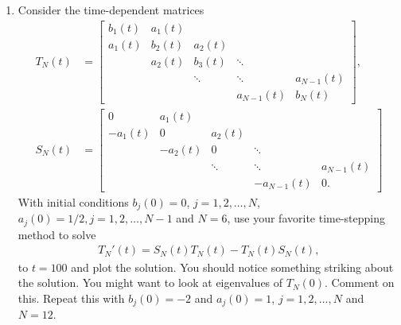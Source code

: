 \documentclass[10pt]{amsart}
\begin{document}
\begin{enumerate}[label={\bf Problem~{\arabic*}:}]
\mline
\item Consider the time-dependent matrices
  \begin{align*}
    T_N(t) &= \begin{bmatrix}
      b_1(t) & a_1(t)\\
      a_1(t) & b_{2}(t) & a_{2}(t)\\
      & a_{2}(t) & b_{3}(t) & \ddots\\
      && \ddots & \ddots & a_{N-1}(t) \\
       &&& a_{N-1}(t) & b_N(t)
     \end{bmatrix},\\
    S_N(t) &= \begin{bmatrix}
      0 & a_1(t)\\
      -a_1(t) & 0 & a_{2}(t)\\
      & -a_{2}(t) & 0 & \ddots\\
      && \ddots & \ddots & a_{N-1}(t) \\
       &&& -a_{N-1}(t) & 0.
      \end{bmatrix}
  \end{align*}
    With initial conditions $b_j(0) = 0$, $j = 1,2,\ldots,N$, $a_j(0) = 1/2, j = 1,2,\ldots,N-1$ and $N = 6$, use your favorite time-stepping method to solve
  \begin{align*}
    T_N'(t) = S_N(t) T_N(t) - T_N(t)S_N(t),
  \end{align*}
  to $t = 100$ and plot the solution.  You should notice something striking about the solution. You might want to look at eigenvalues of $T_N(0)$. Comment on this.    Repeat this with $b_j(0) = -2$ and $a_j(0) = 1$, $j = 1,2,\ldots,N$ and $N = 12$.


  
  \end{enumerate}
\end{document}
